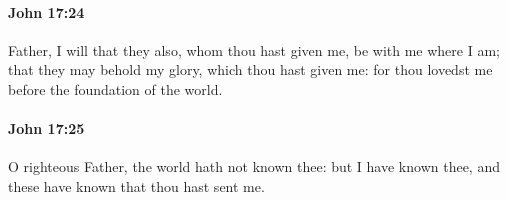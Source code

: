 		\paragraph{John 17:24} %
			\label{JOHN-17-24}

			Father, I will that they also, whom thou hast given me, be with me where I am; that they may behold my glory, which thou hast given me: for thou lovedst me before the foundation of the world.

			\begin{framed}
				\scriptsize
				\begin{compactdesc}
					\item[SBLG] 
				\end{compactdesc}
			\end{framed}

		\paragraph{John 17:25} %
			\label{JOHN-17-25}

			O righteous Father, the world hath not known thee: but I have known thee, and these have known that thou hast sent me.

